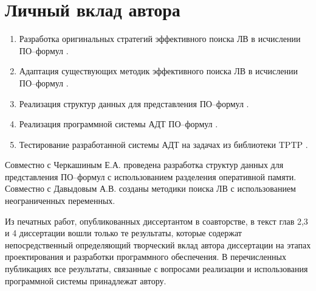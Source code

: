 \section*{Личный вклад автора}
\begin{enumerate}
\item Разработка оригинальных стратегий эффективного поиска ЛВ в исчислении ПО--формул \cite{mais, burvestm, viner, QUANT4, mipro}.
\item Адаптация существующих методик эффективного поиска ЛВ в исчислении ПО--формул \cite{mais, parallel, viner, mipro}.
\item Реализация структур данных для представления ПО--формул \cite{mais, viner, mipro, QUANT4}.
\item Реализация программной системы АДТ ПО--формул \cite{parallel, burvest, viner, mipro, QUANT4}.
\item Тестирование разработанной системы АДТ на задачах из библиотеки TPTP \cite{parallel, viner, mipro}.
\end{enumerate}

Совместно с Черкашиным Е.А. проведена разработка структур данных для представления ПО--формул с использованием разделения оперативной памяти. Совместно с Давыдовым А.В. созданы методики поиска ЛВ с использованием неограниченных переменных.

Из печатных работ, опубликованных диссертантом в соавторстве, в текст глав 2,3 и 4 диссертации вошли только те результаты, которые содержат непосредственный определяющий творческий вклад автора диссертации на этапах проектирования и разработки программного обеспечения. В перечисленных публикациях все результаты, связанные с вопросами реализации и использования программной системы принадлежат автору.






